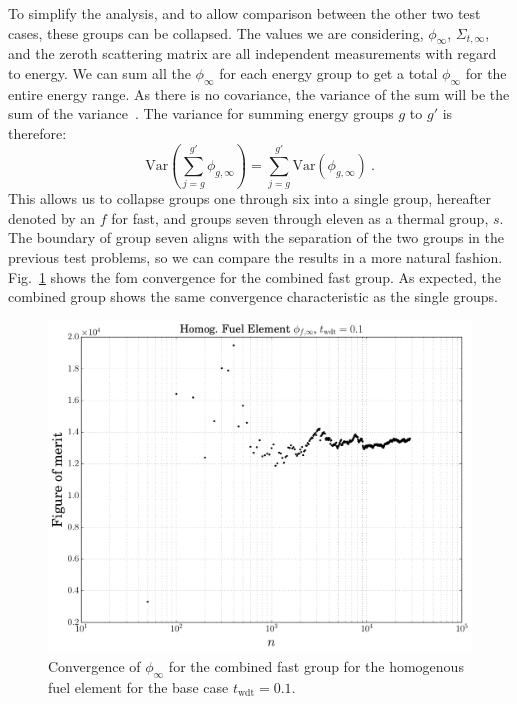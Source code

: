 To simplify the analysis, and to allow comparison between the other
two test cases, these groups can be collapsed. The values we are
considering, $\phi_{\infty}$, $\Sigma_{t,\infty}$, and the zeroth
scattering matrix are all independent measurements with regard to
energy. We can sum all the $\phi_{\infty}$ for each energy group to
get a total $\phi_{\infty}$ for the entire energy range. As there is
no covariance, the variance of the sum will be the sum of the
variance~\cite{taylor1997}. The variance for summing energy groups $g$ to $g'$ is therefore:
\begin{equation*}
  \mathrm{Var}\left( \sum_{j=g}^{g'}\phi_{g,\infty}\right) =   \sum_{j=g}^{g'}\mathrm{Var}\left(\phi_{g,\infty}\right)\:.
\end{equation*}
This allows us to collapse groups one through six into a single group,
hereafter denoted by an $f$ for fast, and groups seven through eleven as
 a thermal group, $s$. 
 The boundary of group seven aligns with the separation
of the two groups in the previous test problems, so we can compare the
results in a more natural
fashion. Fig.~\ref{fig:homog_fom_convergence_example} shows the
\gls{fom} convergence for the combined fast group. As expected, the
combined group shows the same convergence characteristic as the single
groups.

\begin{figure}[hbtp]
  \centering
  \includegraphics[scale=0.5]{images/homog_fom_convergence_example}
  \caption{Convergence of $\phi_{\infty}$ for the combined fast group
    for the homogenous fuel element for the base case
    $t_{\mathrm{wdt}} = 0.1$.}
  \label{fig:homog_fom_convergence_example}
\end{figure}

